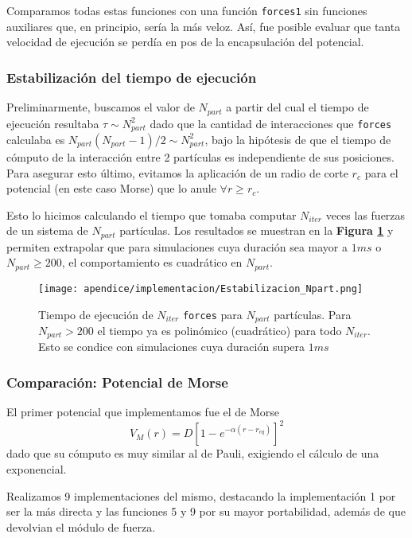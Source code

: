 Comparamos todas estas funciones con una función \texttt{forces1} sin funciones auxiliares que, en principio, sería la más veloz. Así, fue posible evaluar que tanta velocidad de ejecución se perdía en pos de 
la encapsulación del potencial. 

\subsubsection{Estabilización del tiempo de ejecución}

Preliminarmente, buscamos el valor de $N_{part}$ a partir del cual el tiempo de ejecución resultaba $\tau\sim N_{part}^2$ dado que la cantidad de interacciones que \texttt{forces} calculaba es 
$N_{part}(N_{part}-1)/2\sim N_{part}^2$, bajo la hipótesis de que el tiempo de cómputo de la interacción entre 2 partículas es independiente de sus posiciones. 
Para asegurar esto último, evitamos la aplicación de un radio de corte $r_c$ para el potencial (en este caso Morse) que lo anule $\forall r\geq r_c$.

Esto lo hicimos calculando el tiempo que tomaba computar $N_{iter}$ veces las fuerzas de un sistema de $N_{part}$ partículas. 
Los resultados se muestran en la \textbf{Figura \ref{fig:TvsNpart}} y permiten extrapolar que para simulaciones cuya duración sea mayor a $1ms$ o $N_{part}\geq200$, el comportamiento es cuadrático en $N_{part}$.

\begin{figure}[h]
	\centering
	\texttt{[image: apendice/implementacion/Estabilizacion\_Npart.png]}
	\caption{Tiempo de ejecución de $N_{iter}$ \texttt{forces} para $N_{part}$ partículas. Para $N_{part}>200$ el tiempo ya es polinómico (cuadrático) para todo $N_{iter}$. 
	Esto se condice con simulaciones cuya duración supera $1ms$}
	\label{fig:TvsNpart}
\end{figure}

\subsubsection{Comparación: Potencial de Morse}

El primer potencial que implementamos fue el de Morse
\[ V_{M} (r) = D\left[1-e^{-\alpha (r-r_{eq})}\right]^2\]
dado que su cómputo es muy similar al de Pauli, exigiendo el cálculo de una exponencial.

Realizamos 9 implementaciones del mismo, destacando la implementación 1 por ser la más directa y las funciones 5 y 9 por su mayor portabilidad, además de que devolvian el módulo de fuerza.

